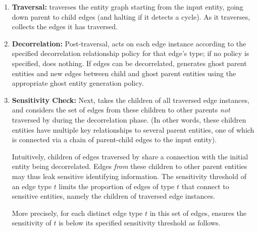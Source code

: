\begin{enumerate}
    \item \textbf{Traversal:} \sys{} traverses the entity graph starting from the input entity,
        going down parent to child edges (and halting if it detects a cycle).  As it traverses,
        \sys{} collects the edges it has traversed. 
    \item \textbf{Decorrelation:} Post-traversal, \sys{} acts on each edge instance according to the specified decorrelation
        relationship policy for that edge's type; if no policy is specified, \sys{} does nothing. If edges can be
        decorrelated, \sys{} generates ghost parent entities and new edges between 
        child and ghost parent entities using the appropriate ghost entity 
        generation policy.
    \item \textbf{Sensitivity Check:} Next, \sys{} takes the children of all traversed edge
        instances, and considers the set of edges from these children to other parents
        \emph{not} traversed by \sys{} during the decorrelation phase. (In other words, these
        children entities have multiple key relationships to several parent entities, one of
        which is connected via a chain of parent-child edges to the input entity).

        Intuitively, children of edges traversed by \sys{} share a connection with the initial
        entity being decorrelated. Edges \emph{from} these children to other parent entities may
        thus leak sensitive identifying information.  The sensitivity threshold of an edge type
        $t$ limits the proportion of edges of type $t$ that connect to sensitive entities,
        namely the children of traversed edge instances. 

        More precisely, for each distinct edge type $t$ in this set of edges, \sys{} ensures the
        sensitivity of $t$ is below its specified sensitivity threshold as follows. 


\end{enumerate}
